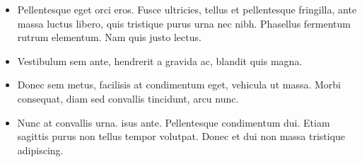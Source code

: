 \documentclass[a0,landscape]{a0poster}
\begin{document}
\begin{multicols}{4}
\begin{itemize}
\item Pellentesque eget orci eros. Fusce ultricies, tellus et pellentesque fringilla, ante massa luctus libero, quis tristique purus urna nec nibh. Phasellus fermentum rutrum elementum. Nam quis justo lectus.
\item Vestibulum sem ante, hendrerit a gravida ac, blandit quis magna.
\item Donec sem metus, facilisis at condimentum eget, vehicula ut massa. Morbi consequat, diam sed convallis tincidunt, arcu nunc.
\item Nunc at convallis urna. isus ante. Pellentesque condimentum dui. Etiam sagittis purus non tellus tempor volutpat. Donec et dui non massa tristique adipiscing.
\end{itemize}

\color{DarkSlateGray} %


\nocite{*} %


\end{multicols}
\end{document}
